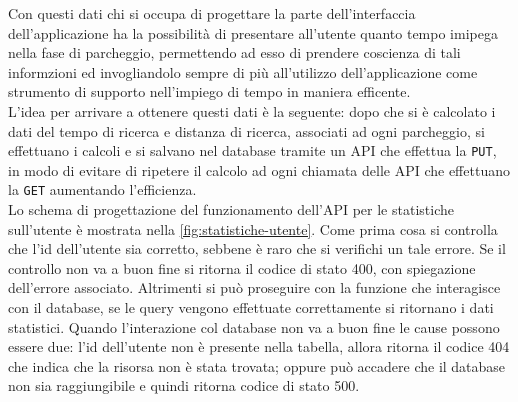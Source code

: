 \documentclass[italian, Lau, oneside, nodefaultfont, noexaminfo]{sapthesis}
\begin{document}

Con questi dati chi si occupa di progettare la parte dell’interfaccia dell’applicazione ha la possibilit\`a di presentare all’utente quanto tempo imipega nella fase di parcheggio, permettendo ad esso di prendere coscienza di tali informzioni ed invogliandolo sempre di pi\`u all'utilizzo dell'applicazione come strumento di supporto nell'impiego di tempo in maniera efficente. 
\\

L'idea per arrivare a ottenere questi dati \`e la seguente: dopo che si \`e calcolato i dati del tempo di ricerca e distanza di ricerca, associati ad ogni parcheggio, si effettuano i calcoli e si salvano nel database tramite un API che effettua la \texttt{PUT}, in modo di evitare di ripetere il calcolo  ad ogni chiamata delle API che effettuano la \texttt{GET} aumentando l'efficienza.
\\

Lo schema di progettazione del funzionamento dell'API per le statistiche sull'utente è mostrata nella \autoref{fig:statistiche-utente}. Come prima cosa si controlla che l'id dell'utente sia corretto, sebbene  è raro che si verifichi un tale errore. Se il controllo non va a buon fine si ritorna il codice di stato 400, con spiegazione dell'errore associato. Altrimenti si può proseguire con la funzione che interagisce con il database, se le query vengono effettuate correttamente si ritornano i dati statistici. Quando l'interazione col database non va a buon fine le cause possono essere due: l'id dell'utente non è presente nella tabella, allora ritorna il codice 404 che indica che la risorsa non è stata trovata; oppure può accadere che il database non sia raggiungibile e quindi ritorna codice di stato 500.
\end{document}
